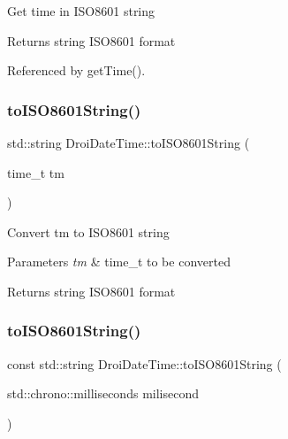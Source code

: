 Get time in I\+S\+O8601 string \begin{DoxyReturn}{Returns}
string I\+S\+O8601 format 
\end{DoxyReturn}


Referenced by get\+Time().

\mbox{\label{class_droi_date_time_ad77372692061dd8c396b09ce7544d168}} 
\subsubsection{\texorpdfstring{to\+I\+S\+O8601\+String()}{toISO8601String()}\hspace{0.1cm}{\footnotesize\ttfamily [2/3]}}
{\footnotesize\ttfamily std\+::string Droi\+Date\+Time\+::to\+I\+S\+O8601\+String (\begin{DoxyParamCaption}\item[{time\+\_\+t}]{tm }\end{DoxyParamCaption})\hspace{0.3cm}{\ttfamily [static]}}

Convert tm to I\+S\+O8601 string 
\begin{DoxyParams}{Parameters}
{\em tm} & time\+\_\+t to be converted \\
\hline
\end{DoxyParams}
\begin{DoxyReturn}{Returns}
string I\+S\+O8601 format 
\end{DoxyReturn}
\mbox{\label{class_droi_date_time_a9adddae64481892a0d413f36b20375d3}} 
\subsubsection{\texorpdfstring{to\+I\+S\+O8601\+String()}{toISO8601String()}\hspace{0.1cm}{\footnotesize\ttfamily [3/3]}}
{\footnotesize\ttfamily const std\+::string Droi\+Date\+Time\+::to\+I\+S\+O8601\+String (\begin{DoxyParamCaption}\item[{std\+::chrono\+::milliseconds}]{milisecond }\end{DoxyParamCaption})\hspace{0.3cm}{\ttfamily [static]}}

